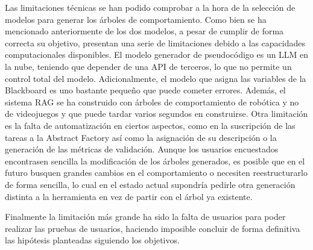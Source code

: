 Las limitaciones técnicas se han podido comprobar a la hora de la selección de modelos para generar los árboles de comportamiento.
Como bien se ha mencionado anteriormente de los dos modelos, a pesar de cumplir de forma correcta su objetivo, presentan una serie de limitaciones debido a las capacidades computacionales disponibles.
El modelo generador de pseudocódigo es un LLM en la nube, teniendo que depender de una API de terceros, lo que no permite un control total del modelo.
Adicionalmente, el modelo que asigna las variables de la Blackboard es uno bastante pequeño que puede cometer errores.
Además, el sistema RAG se ha construido con árboles de comportamiento de robótica y no de videojuegos y que puede tardar varios segundos en construirse.
Otra limitación es la falta de automatización en ciertos aspectos, como en la suscripción de las tareas a la Abstract Factory así como la asignación de su descripción o la generación de las métricas de validación.
Aunque los usuarios encuestados encontrasen sencilla la modificación de los árboles generados, es posible que en el futuro busquen grandes cambios en el comportamiento o necesiten reestructurarlo de forma sencilla, lo cual en el estado actual supondría pedirle otra generación distinta a la herramienta en vez de partir con el árbol ya existente.

Finalmente la limitación más grande ha sido la falta de usuarios para poder realizar las pruebas de usuarios, haciendo imposible concluir de forma definitiva las hipótesis planteadas siguiendo los objetivos.